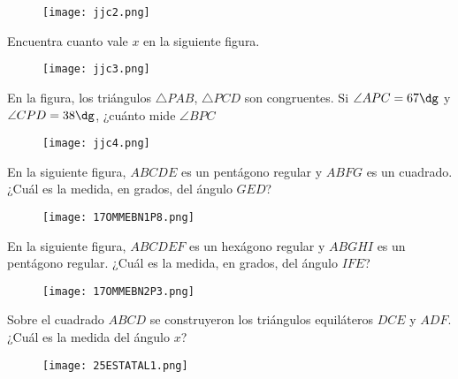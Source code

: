 \begin{figure}[!h]
    \centering
    \texttt{[image: jjc2.png]}
\end{figure}

\begin{problem}[$2 \clubsuit$]
    Encuentra cuanto vale $x$ en la siguiente figura.
\end{problem}

\begin{figure}[h!]
    \centering
    \texttt{[image: jjc3.png]}
\end{figure}

\begin{problem}[$2 \clubsuit$]
    En la figura, los triángulos $\triangle PAB$, $\triangle PCD$ 
    son congruentes. Si $\angle APC = 67 \dg$ y $\angle CPD = 38 \dg$, 
    ¿cuánto mide $\angle BPC$ 
\end{problem}

\begin{figure}[h!]
    \centering
    \texttt{[image: jjc4.png]}
\end{figure}

\begin{problem}
    En la siguiente figura, \(ABCDE\) es un pentágono regular 
    y \(ABFG\) es un cuadrado. ¿Cuál es la medida, en grados, 
    del ángulo \(GED\)?
\end{problem}

\begin{figure}[!h]
    \centering
    \texttt{[image: 17OMMEBN1P8.png]}
\end{figure}

\begin{problem}
    En la siguiente figura, $ABCDEF$ es un hexágono regular y 
    $ABGHI$ es un pentágono regular. 
    ¿Cuál es la medida, en grados, del ángulo $IFE$?
\end{problem}

\begin{figure}[!h]
    \centering
    \texttt{[image: 17OMMEBN2P3.png]}
\end{figure}

\begin{problem}
    Sobre el cuadrado $ABCD$ se construyeron los triángulos 
    equiláteros $DCE$ y $ADF$. ¿Cuál es la medida del ángulo $x$?
\end{problem}
\begin{figure}[h!]
    \centering
    \texttt{[image: 25ESTATAL1.png]}
\end{figure}

